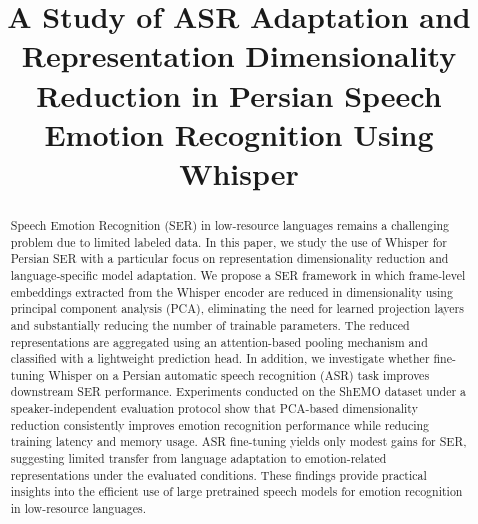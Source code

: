 \documentclass[conference]{IEEEtran}
\begin{document}
\title{A Study of ASR Adaptation and Representation Dimensionality Reduction in Persian Speech Emotion Recognition Using Whisper}

\author{
\and
{}
\and
{}
}

\maketitle

\begin{abstract}
Speech Emotion Recognition (SER) in low-resource languages remains a challenging problem due to limited labeled data. In this paper, we study the use of Whisper for Persian SER with a particular focus on representation dimensionality reduction and language-specific model adaptation. We propose a SER framework in which frame-level embeddings extracted from the Whisper encoder are reduced in dimensionality using principal component analysis (PCA), eliminating the need for learned projection layers and substantially reducing the number of trainable parameters. The reduced representations are aggregated using an attention-based pooling mechanism and classified with a lightweight prediction head. In addition, we investigate whether fine-tuning Whisper on a Persian automatic speech recognition (ASR) task improves downstream SER performance. Experiments conducted on the ShEMO dataset under a speaker-independent evaluation protocol show that PCA-based dimensionality reduction consistently improves emotion recognition performance while reducing training latency and memory usage. ASR fine-tuning yields only modest gains for SER, suggesting limited transfer from language adaptation to emotion-related representations under the evaluated conditions. These findings provide practical insights into the efficient use of large pretrained speech models for emotion recognition in low-resource languages.
\end{abstract}
\end{document}
